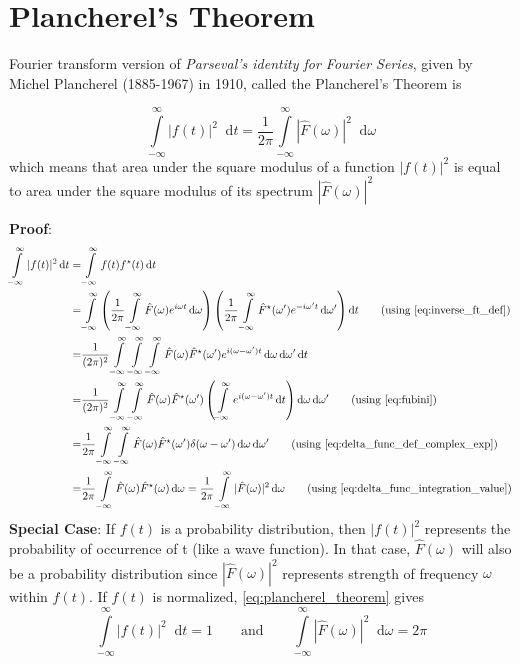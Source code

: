\documentclass[11pt, a4paper]{article}
\let\oldsection\section
\renewcommand{\section}{%
	\setcounter{equation}{0}%
	\oldsection%
}
\newcommand{\quotedsingle}[1]{#1}	%
\newcommand{\quotedsingleit}[1]{\quotedsingle{\textit{#1}}}	%
\newcommand{\eqrefnp}[1]{\textup{\ref{#1}}}  %
\newcommand{\primed}[1]{#1^{\prime}}
\newcommand{\omegap}{\primed{\omega}}	%
\newcommand{\diff}{\mathop{}\!\mathrm{d}}
\newcommand{\dt}{\diff t}
\newcommand{\domega}{\diff \omega}
\newcommand{\domegap}{\diff \omegap}
\newcommand{\dint}[2]{\int \limits_{#1}^{#2}}  %
\newcommand{\intinfty}{\dint{-\infty}{\infty}}	%
\newcommand{\iintinfty}{\intinfty \intinfty}	%
\newcommand{\iiintinfty}{\intinfty \intinfty \intinfty}	%
\begin{document}
	\section{Plancherel's Theorem}\label{sec:plancherel_theorem}
	Fourier transform version of \quotedsingleit{Parseval's identity for Fourier Series}, given by Michel Plancherel (1885-1967) in 1910, called the Plancherel's Theorem is \cite{herman2016fourieranalysis}
	
	\begin{equation}\label{eq:plancherel_theorem}
		\intinfty |f(t)|^{2} \dt = \frac{1}{2 \pi} \intinfty |\hat{F}(\omega)|^{2} \domega
	\end{equation}
	which means that area under the square modulus of a function $|f(t)|^{2}$ is equal to area under the square modulus of its spectrum $|\hat{F}(\omega)|^{2}$
	
	\vspace{4pt}
	\noindent
	\textbf{Proof}: 
	\begin{align*}
		\intinfty |f(t)|^{2} \dt 
		= & \intinfty f(t)f^{\star}(t) \dt \\
		= & \intinfty \left(\frac{1}{2 \pi} \intinfty \hat{F}(\omega) e^{i \omega t} \domega \right) \left(\frac{1}{2 \pi} \intinfty \hat{F}^{\star}(\omegap) e^{-i \omegap t} \domegap \right) \dt \tag{using \eqrefnp{eq:inverse_ft_def}} \\
		= & \frac{1}{(2 \pi)^2} \iiintinfty \hat{F}(\omega) \hat{F}^{\star}(\omegap) e^{i (\omega - \omegap) t} \domega \domegap \dt \\
		= & \frac{1}{(2 \pi)^2} \iintinfty \hat{F}(\omega) \hat{F}^{\star}(\omegap) \left( \intinfty e^{i (\omega - \omegap) t} \dt \right) \domega \domegap \tag{using \eqrefnp{eq:fubini}} \\
		= & \frac{1}{2 \pi} \iintinfty \hat{F}(\omega) \hat{F}^{\star}(\omegap) \delta(\omega - \omegap) \domega \domegap \tag{using \eqrefnp{eq:delta_func_def_complex_exp}} \\
		= & \frac{1}{2 \pi} \intinfty \hat{F}(\omega) \hat{F}^{\star}(\omega) \domega 
		= \frac{1}{2 \pi} \intinfty |\hat{F}(\omega)|^{2} \domega  \tag{using \eqrefnp{eq:delta_func_integration_value}} \\
	\end{align*}
	\noindent
	\textbf{Special Case}: If $f(t)$ is a probability distribution, then $|f(t)|^{2}$ represents the probability of occurrence of t (like a wave function). In that case, $\hat{F}(\omega)$ will also be a probability distribution since $|\hat{F}(\omega)|^{2}$ represents strength of frequency $\omega$ within $f(t)$. If $f(t)$ is normalized, \eqref{eq:plancherel_theorem} gives
	\begin{equation}\label{eq:plancherel_normal_func_and_spectrum}
		\intinfty |f(t)|^{2} \dt = 1 \qquad \text{and} \qquad \intinfty |\hat{F}(\omega)|^{2} \domega = 2 \pi
	\end{equation}
	
\end{document}
